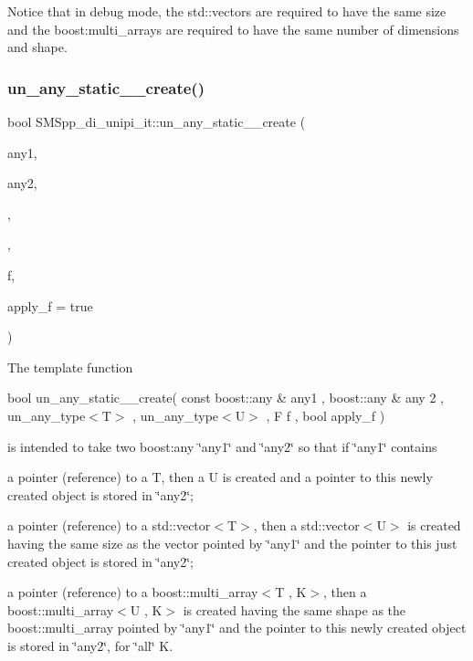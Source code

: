 Notice that in debug mode, the std\+::vectors are required to have the same size and the boost\+:multi\+\_\+arrays are required to have the same number of dimensions and shape. \mbox{\label{group__boost__any__stuff_gaaf87cecb7f9c36476431ceb5bf943b45}} 
\subsubsection{\texorpdfstring{un\+\_\+any\+\_\+static\+\_\+\_\+create()}{un\_any\_static\_2\_create()}}
{\footnotesize\ttfamily bool S\+M\+Spp\+\_\+di\+\_\+unipi\+\_\+it\+::un\+\_\+any\+\_\+static\+\_\+\_\+create (\begin{DoxyParamCaption}\item[{const boost\+::any \&}]{any1,  }\item[{boost\+::any \&}]{any2,  }\item[{\mbox{\hyperlink{struct_s_m_spp__di__unipi__it_1_1un__any__type}{un\+\_\+any\+\_\+type}}$<$ T $>$}]{,  }\item[{\mbox{\hyperlink{struct_s_m_spp__di__unipi__it_1_1un__any__type}{un\+\_\+any\+\_\+type}}$<$ U $>$}]{,  }\item[{F}]{f,  }\item[{bool}]{apply\+\_\+f = {\ttfamily true} }\end{DoxyParamCaption})}

The template function

bool un\+\_\+any\+\_\+static\+\_\+\_\+create( const boost\+::any \& any1 , boost\+::any \& any 2 , un\+\_\+any\+\_\+type$<$\+T$>$ , un\+\_\+any\+\_\+type$<$\+U$>$ , F f , bool apply\+\_\+f )

is intended to take two boost\+:any \char`\"{}any1\char`\"{} and \char`\"{}any2\char`\"{} so that if \char`\"{}any1\char`\"{} contains


\begin{DoxyItemize}
\item a pointer (reference) to a T, then a U is created and a pointer to this newly created object is stored in \char`\"{}any2\char`\"{};
\item a pointer (reference) to a std\+::vector$<$\+T$>$, then a std\+::vector$<$\+U$>$ is created having the same size as the vector pointed by \char`\"{}any1\char`\"{} and the pointer to this just created object is stored in \char`\"{}any2\char`\"{};
\item a pointer (reference) to a boost\+::multi\+\_\+array$<$\+T , K$>$, then a boost\+::multi\+\_\+array$<$\+U , K$>$ is created having the same shape as the boost\+::multi\+\_\+array pointed by \char`\"{}any1\char`\"{} and the pointer to this newly created object is stored in \char`\"{}any2\char`\"{}, for \char`\"{}all\char`\"{} K.
\end{DoxyItemize}

